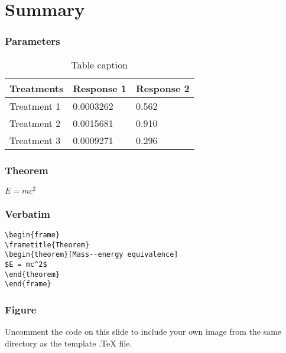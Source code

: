 \documentclass{beamer}
\begin{document}
\section{Summary}

\begin{frame}
\frametitle{Parameters}
\begin{table}
\begin{tabular}{l l l}
\toprule
\textbf{Treatments} & \textbf{Response 1} & \textbf{Response 2}\\
\midrule
Treatment 1 & 0.0003262 & 0.562 \\
Treatment 2 & 0.0015681 & 0.910 \\
Treatment 3 & 0.0009271 & 0.296 \\
\bottomrule
\end{tabular}
\caption{Table caption}
\end{table}
\end{frame}


\begin{frame}
\frametitle{Theorem}
\begin{theorem}
$E = mc^2$
\end{theorem}
\end{frame}


\begin{frame}[fragile] %
\frametitle{Verbatim}
\begin{example}
\begin{verbatim}
\begin{frame}
\frametitle{Theorem}
\begin{theorem}[Mass--energy equivalence]
$E = mc^2$
\end{theorem}
\end{frame}\end{verbatim}
\end{example}
\end{frame}


\begin{frame}
\frametitle{Figure}
Uncomment the code on this slide to include your own image from the same directory as the template .TeX file.
\end{frame}
\end{document}
